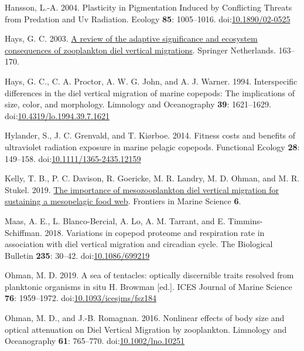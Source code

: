\documentclass[
  letterpaper,
  DIV=11,
  numbers=noendperiod]{scrartcl}
\newlength{\cslhangindent}
\newlength{\cslentryspacingunit} %
\newenvironment{CSLReferences}[2] %
 {%
  \setlength{\parindent}{0pt}
  \ifodd #1
  \let\oldpar\par
  \def\par{\hangindent=\cslhangindent\oldpar}
  \fi
  \setlength{\parskip}{#2\cslentryspacingunit}
 }%
 {}
\begin{document}
\begin{CSLReferences}{1}{0}
\leavevmode{}%
Hansson, L.-A. 2004. Plasticity in Pigmentation Induced by Conflicting
Threats from Predation and Uv Radiation. Ecology \textbf{85}:
1005--1016. doi:\href{https://doi.org/10.1890/02-0525}{10.1890/02-0525}

\leavevmode{}%
Hays, G. C. 2003. \href{https://doi.org/10.1007/978-94-017-2276-6_18}{A
review of the adaptive significance and ecosystem consequences of
zooplankton diel vertical migrations}. Springer Netherlands. 163--170.

\leavevmode{}%
Hays, G. C., C. A. Proctor, A. W. G. John, and A. J. Warner. 1994.
Interspecific differences in the diel vertical migration of marine
copepods: The implications of size, color, and morphology. Limnology and
Oceanography \textbf{39}: 1621--1629.
doi:\href{https://doi.org/10.4319/lo.1994.39.7.1621}{10.4319/lo.1994.39.7.1621}

\leavevmode{}%
Hylander, S., J. C. Grenvald, and T. Kiørboe. 2014. Fitness costs and
benefits of ultraviolet radiation exposure in marine pelagic copepods.
Functional Ecology \textbf{28}: 149--158.
doi:\href{https://doi.org/10.1111/1365-2435.12159}{10.1111/1365-2435.12159}

\leavevmode{}%
Kelly, T. B., P. C. Davison, R. Goericke, M. R. Landry, M. D. Ohman, and
M. R. Stukel. 2019.
\href{https://www.frontiersin.org/articles/10.3389/fmars.2019.00508}{The
importance of mesozooplankton diel vertical migration for sustaining a
mesopelagic food web}. Frontiers in Marine Science \textbf{6}.

\leavevmode{}%
Maas, A. E., L. Blanco-Bercial, A. Lo, A. M. Tarrant, and E.
Timmins-Schiffman. 2018. Variations in copepod proteome and respiration
rate in association with diel vertical migration and circadian cycle.
The Biological Bulletin \textbf{235}: 30--42.
doi:\href{https://doi.org/10.1086/699219}{10.1086/699219}

\leavevmode{}%
Ohman, M. D. 2019. A sea of tentacles: optically discernible traits
resolved from planktonic organisms in situ H. Browman {[}ed.{]}. ICES
Journal of Marine Science \textbf{76}: 1959--1972.
doi:\href{https://doi.org/10.1093/icesjms/fsz184}{10.1093/icesjms/fsz184}

\leavevmode{}%
Ohman, M. D., and J.-B. Romagnan. 2016. Nonlinear effects of body size
and optical attenuation on Diel Vertical Migration by zooplankton.
Limnology and Oceanography \textbf{61}: 765--770.
doi:\href{https://doi.org/10.1002/lno.10251}{10.1002/lno.10251}


\end{CSLReferences}
\end{document}
